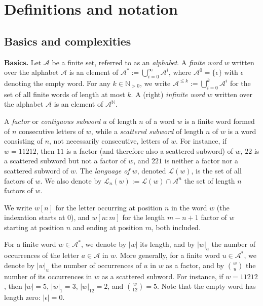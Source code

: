\documentclass{template_arxiv}
\theoremstyle{definition}
\newcommand{\N}{\mathbb{N}}
\newcommand{\A}{\mathcal{A}}
\newcommand{\lan}{\mathcal{L}}
\begin{document}
\section{Definitions and notation}\label{sec:def}

\subsection{Basics and complexities}

\noindent\textbf{Basics.} Let $\A$ be a finite set, referred to as an \emph{alphabet}. A \emph{finite word} $w$ written over the alphabet $\A$ is an element of $\A^*:=\bigcup_{i=0}^{\infty}\A^i$, where $\A^0=\{\epsilon\}$ with $\epsilon$ denoting the empty word. For any $k\in\N_{>0}$, we write $\A^{\leq k}:=\bigcup_{i=0}^{k}\A^i$ for the set of all finite words of length at most $k$. A (right) \emph{infinite word} $w$ written over the alphabet $\A$ is an element of $\A^\N$.

A \emph{factor} or \emph{contiguous subword} $u$ of length $n$ of a word $w$ is a finite word formed of $n$ consecutive letters of $w$, while a \emph{scattered subword} of length $n$ of $w$ is a word consisting of $n$, not necessarily consecutive, letters of $w$. For instance, if $w=11212$, then $11$ is a factor (and therefore also a scattered subword) of $w$, $22$ is a scattered subword but not a factor of $w$, and $221$ is neither a factor nor a scattered subword of $w$. The \emph{language of $w$}, denoted $\lan(w)$, is the set of all factors of $w$. We also denote by $\lan_n(w):=\lan(w)\cap\A^{n}$ the set of length $n$ factors of $w$.

We write $w[n]$ for the letter occurring at position $n$ in the word $w$ (the indexation starts at $0$), and $w[n:m]$ for the length $m-n+1$ factor of $w$ starting at position $n$ and ending at position $m$, both included.

For a finite word $w\in\A^*$, we denote by $|w|$ its length, and by $|w|_a$ the number of occurrences of the letter $a\in\A$ in $w$. More generally, for a finite word $u\in\A^*$, we denote by $|w|_u$ the number of occurrences of $u$ in $w$ as a factor, and by $\binom{w}{u}$ the number of its occurrences in $w$ as a scattered subword. For instance, if $w=11212$, then $|w|=5$, $|w|_1=3$, $|w|_{12}=2$, and $\binom{w}{12}=5$. Note that the empty word has length zero: $|\epsilon|=0$.
\end{document}
